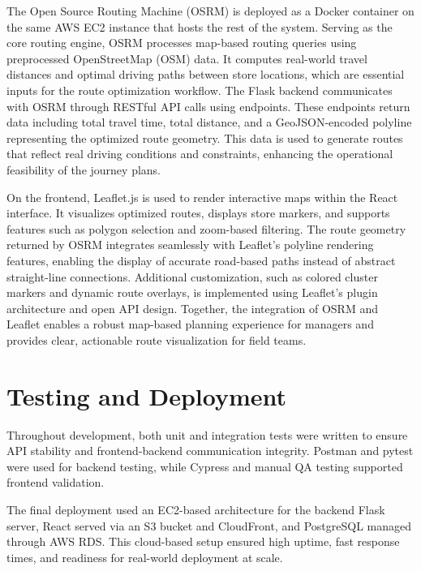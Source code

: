 The Open Source Routing Machine (OSRM) is deployed as a Docker container on the same AWS EC2 instance that hosts the rest of the system. Serving as the core routing engine, OSRM processes map-based routing queries using preprocessed OpenStreetMap (OSM) data. It computes real-world travel distances and optimal driving paths between store locations, which are essential inputs for the route optimization workflow. The Flask backend communicates with OSRM through RESTful API calls using endpoints. These endpoints return data including total travel time, total distance, and a GeoJSON-encoded polyline representing the optimized route geometry. This data is used to generate routes that reflect real driving conditions and constraints, enhancing the operational feasibility of the journey plans.

On the frontend, Leaflet.js is used to render interactive maps within the React interface. It visualizes optimized routes, displays store markers, and supports features such as polygon selection and zoom-based filtering. The route geometry returned by OSRM integrates seamlessly with Leaflet’s polyline rendering features, enabling the display of accurate road-based paths instead of abstract straight-line connections. Additional customization, such as colored cluster markers and dynamic route overlays, is implemented using Leaflet’s plugin architecture and open API design. Together, the integration of OSRM and Leaflet enables a robust map-based planning experience for managers and provides clear, actionable route visualization for field teams.

\section{Testing and Deployment}
Throughout development, both unit and integration tests were written to ensure API stability and frontend-backend communication integrity. Postman and pytest were used for backend testing, while Cypress and manual QA testing supported frontend validation.

The final deployment used an EC2-based architecture for the backend Flask server, React served via an S3 bucket and CloudFront, and PostgreSQL managed through AWS RDS. This cloud-based setup ensured high uptime, fast response times, and readiness for real-world deployment at scale.